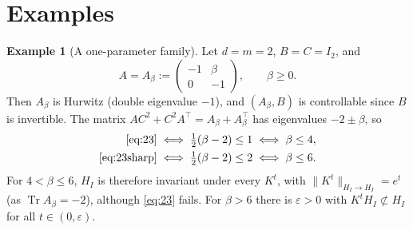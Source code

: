 \documentclass[11pt]{amsart}
\numberwithin{equation}{section}
\theoremstyle{definition}
\newtheorem{example}[theorem]{Example}
\theoremstyle{remark}
\newcommand{\Tr}{\operatorname{Tr}}
\newcommand{\tp}{\top}
\begin{document}
\section{Examples}\label{sec:examples}

\begin{example}[A one-parameter family]\label{ex:beta}
Let $d=m=2$, $B=C=I_2$, and
\[
A=A_\beta:=\begin{pmatrix}-1&\beta\\0&-1\end{pmatrix},\qquad\beta\ge0 .
\]
Then $A_\beta$ is Hurwitz (double eigenvalue $-1$), and $(A_\beta,B)$ is controllable since $B$ is invertible. The
matrix $AC^2+C^2A^\tp=A_\beta+A_\beta^\tp$ has eigenvalues $-2\pm\beta$, so
\begin{align*}
\eqref{eq:23}&\iff\tfrac12(\beta-2)\le1\iff\beta\le4,\\
\eqref{eq:23sharp}&\iff\tfrac12(\beta-2)\le2\iff\beta\le6 .
\end{align*}
For $4<\beta\le6$, $H_I$ is therefore invariant under every $K^t$, with $\|K^t\|_{H_I\to H_I}=e^{t}$ (as
$\Tr A_\beta=-2$), although \eqref{eq:23} fails. For $\beta>6$ there is $\varepsilon>0$ with
$K^tH_I\not\subset H_I$ for all $t\in(0,\varepsilon)$.


\end{example}
\end{document}
